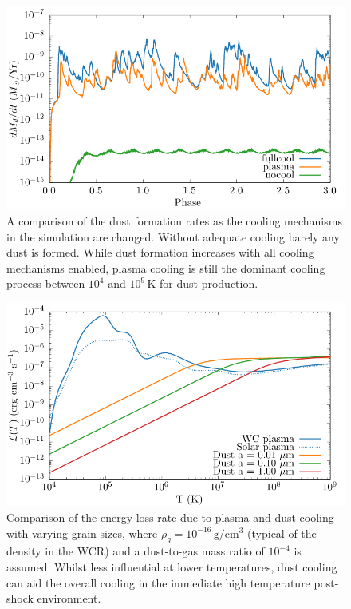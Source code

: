 \begin{figure}
  \centering
  \includegraphics{assets/cool-phase-dust_rate.pdf}
  \caption[Comparison of dust formation rates with cooling methods]{A comparison of the dust formation rates as the cooling mechanisms in the simulation are changed. Without adequate cooling barely any dust is formed. While dust formation increases with all cooling mechanisms enabled, plasma cooling is still the dominant cooling process between $10^4$ and $10^9 \, \si{\kelvin}$ for dust production.}
  \label{fig:coolingprocess-dustproduction}
\end{figure}

\begin{figure}
  \centering
  \includegraphics{assets/dust-plasma-cooling-comparison/cooling-comparison-forpaper2.pdf}
  \caption[Comparison of dust and plasma cooling rates in post-shock environment]{Comparison of the energy loss rate due to plasma and dust cooling with varying grain sizes, where $\rho_g = 10^{-16} \, \si{\gram\per\centi\metre\cubed}$ (typical of the density in the WCR) and a dust-to-gas mass ratio of $10^{-4}$ is assumed. Whilst less influential at lower temperatures, dust cooling can aid the overall cooling in the immediate high temperature post-shock environment.}
  \label{fig:postshockcoolcomparison}
\end{figure}

